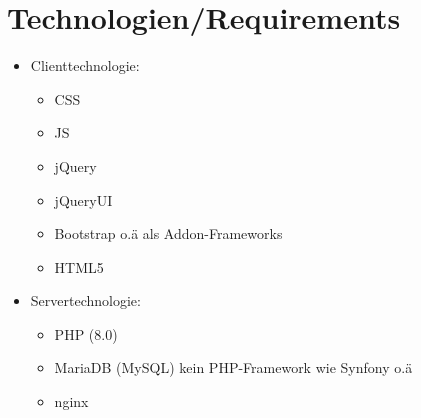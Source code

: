 \documentclass{report}
\begin{document}
\section{Technologien/Requirements}

\begin{itemize}
    \item Clienttechnologie: 
    \begin{itemize}
        \item CSS\\
        \item JS\\
        \item jQuery\\
        \item jQueryUI\\
        \item Bootstrap o.ä als Addon-Frameworks\\
        \item HTML5 \\
    \end{itemize}
    
    \item Servertechnologie: 
    \begin{itemize}
        \item PHP (8.0)
        \item MariaDB (MySQL) kein PHP-Framework wie Synfony o.ä\\
        \item nginx
    \end{itemize}
    

\end{itemize}
\end{document}
